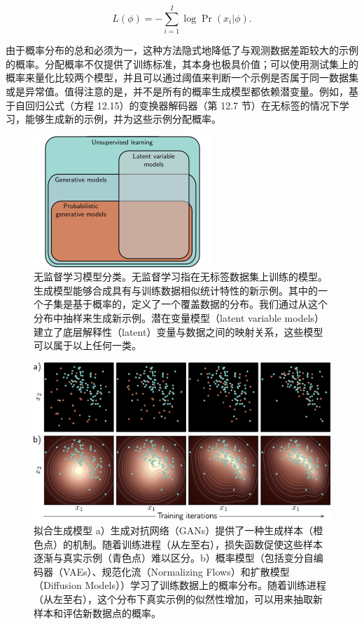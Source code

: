 \begin{equation}
L(\phi) = -\sum_{i=1}^{I} \log \Pr(x_i|\phi) .
\end{equation}

由于概率分布的总和必须为一，这种方法隐式地降低了与观测数据差距较大的示例的概率。分配概率不仅提供了训练标准，其本身也极具价值；可以使用测试集上的概率来量化比较两个模型，并且可以通过阈值来判断一个示例是否属于同一数据集或是异常值。值得注意的是，并不是所有的概率生成模型都依赖潜变量。例如，基于自回归公式（方程 12.15）的变换器解码器（第 12.7 节）在无标签的情况下学习，能够生成新的示例，并为这些示例分配概率。

\begin{figure}[ht!]
\centering
\includegraphics[width=0.7\linewidth]{png/chapter14/UnsupOverview.png}
\caption{无监督学习模型分类。无监督学习指在无标签数据集上训练的模型。生成模型能够合成具有与训练数据相似统计特性的新示例。其中的一个子集是基于概率的，定义了一个覆盖数据的分布。我们通过从这个分布中抽样来生成新示例。潜在变量模型（latent variable models）建立了底层解释性（latent）变量与数据之间的映射关系，这些模型可以属于以上任何一类。}
\end{figure}


\begin{figure}[ht!]
\centering
\includegraphics[width=0.7\linewidth]{png/chapter14/UnsupLearning.png}
\caption{拟合生成模型 a）生成对抗网络（GANs）提供了一种生成样本（橙色点）的机制。随着训练进程（从左至右），损失函数促使这些样本逐渐与真实示例（青色点）难以区分。b）概率模型（包括变分自编码器（VAEs）、规范化流（Normalizing Flows）和扩散模型（Diffusion Models））学习了训练数据上的概率分布。随着训练进程（从左至右），这个分布下真实示例的似然性增加，可以用来抽取新样本和评估新数据点的概率。}
\end{figure}


